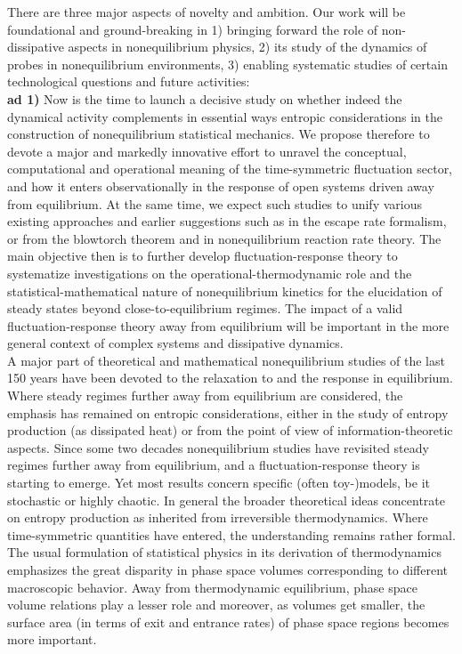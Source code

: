 There are three major aspects of novelty and ambition.  Our work will be foundational and ground-breaking in 1) bringing forward the role of non-dissipative aspects in nonequilibrium physics, 2) its study of the dynamics of probes in nonequilibrium environments, 3) enabling systematic studies of certain technological questions and future activities:\\
{\bf ad 1)} Now is the time to launch a decisive study on whether indeed the dynamical activity complements in essential ways entropic considerations in the construction of nonequilibrium statistical  mechanics. We propose therefore to devote a major and markedly innovative effort to unravel the conceptual, computational and operational meaning of the time-symmetric fluctuation sector, and how it enters observationally in the response of open systems driven away from equilibrium. At the same time, we expect such studies to unify various existing approaches and earlier suggestions such as in the escape rate formalism, or from the blowtorch theorem and in nonequilibrium reaction rate theory. The main objective then is to further develop fluctuation-response theory to systematize investigations on the operational-thermodynamic role and the statistical-mathematical nature of nonequilibrium kinetics for the elucidation of steady states beyond close-to-equilibrium regimes. The impact of a valid fluctuation-response theory away from equilibrium will be important in the more general context of complex systems and dissipative dynamics.\\
A major part of theoretical and mathematical nonequilibrium studies of the last 150 years have been devoted to the relaxation to and the response in equilibrium. Where steady regimes further away from equilibrium are considered, the emphasis has remained on entropic considerations, either in the study of entropy production (as dissipated heat) or from the point of view of information-theoretic aspects.
Since some two decades nonequilibrium studies have revisited steady regimes further away from equilibrium, and a fluctuation-response theory is starting to emerge. Yet most results concern specific (often toy-)models, be it stochastic or highly chaotic. In general the broader theoretical ideas concentrate on entropy production as inherited from irreversible thermodynamics. Where time-symmetric quantities have entered, the understanding remains rather formal.
The usual formulation of statistical physics in its derivation of thermodynamics emphasizes the great disparity in phase space volumes corresponding to different macroscopic behavior. Away from thermodynamic equilibrium, phase space volume relations play a lesser role and moreover, as volumes get smaller, the surface area (in terms of exit and entrance rates) of phase space regions becomes more important.
